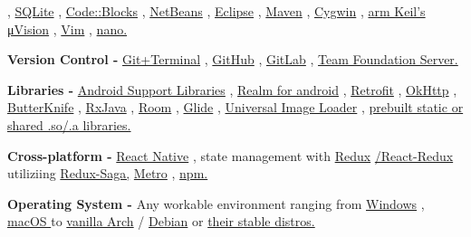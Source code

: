 \begin{skillsentries}
{\begin{skillsitems}
{        , 
        {\href{https://www.sqlite.org/index.html}{SQLite}}
        , 
        {\href{http://www.codeblocks.org}{Code::Blocks}}
        , 
        {\href{https://netbeans.org}{NetBeans}}
        , 
        {\href{https://www.eclipse.org}{Eclipse}}
        , 
        {\href{https://maven.apache.org}{Maven}}
        , 
        {\href{https://www.cygwin.com}{Cygwin}}
        , 
        {\href{http://www.keil.com/product/}{arm Keil's μVision}}
        , 
        {\href{https://www.vim.org}{Vim}}
        , 
        {\href{https://www.nano-editor.org}{nano.}}}
        \item {\textbf{Version Control -} 
        {\href{https://github.com/codepath/ios_guides/wiki/Using-Git-with-Terminal}{Git+Terminal}}
        , 
        {\href{https://github.com}{GitHub}}
        , 
        {\href{https://about.gitlab.com}{GitLab}}
        , 
        {\href{https://visualstudio.microsoft.com/tfs/}{Team Foundation Server.}}}
        \item {\textbf{Libraries -} 
        {\href{https://developer.android.com/topic/libraries/support-library/}{Android Support Libraries}}
        , 
        {\href{https://realm.io/docs/java/latest/}{Realm for android}}
        , 
        {\href{https://square.github.io/retrofit/}{Retrofit}}
        , 
        {\href{http://square.github.io/okhttp/}{OkHttp}}
        , 
        {\href{http://jakewharton.github.io/butterknife/}{ButterKnife}}
        , 
        {\href{https://www.toptal.com/android/functional-reactive-android-rxjava}{RxJava}}
        , 
        {\href{https://developer.android.com/topic/libraries/architecture/room}{Room}}
        , 
        {\href{https://github.com/bumptech/glide}{Glide}}
        , 
        {\href{https://github.com/nostra13/Android-Universal-Image-Loader}{Universal Image Loader}}
        , 
        {\href{https://developer.android.com/ndk/guides/prebuilts}{prebuilt static or shared .so/.a libraries.}}}
        \item {\textbf{Cross-platform -} 
        {\href{https://facebook.github.io/react-native/}{React Native}}
        , state management with 
        {\href{https://redux.js.org}{Redux}}
        {\href{https://react-redux.js.org}{/React-Redux }}
        utiliziing 
        {\href{https://redux-saga.js.org}{Redux-Saga,}} 
        {\href{https://github.com/facebook/metro}{Metro}}
        ,
         {\href{https://www.npmjs.com}{npm.}}}
        \item {\textbf{Operating System - } Any workable environment ranging from 
        {\href{https://www.microsoft.com/en-us/windows}{Windows}}
        , 
        {\href{https://www.apple.com/lae/macos/mojave/}{macOS }}
        to  
        {\href{https://www.archlinux.org}{vanilla Arch}}
        /
        {\href{https://www.debian.org}{Debian}} 
        or 
        {\href{https://distrowatch.com}{their stable distros.}}}
      \end{skillsitems}
    }


\end{skillsentries}
